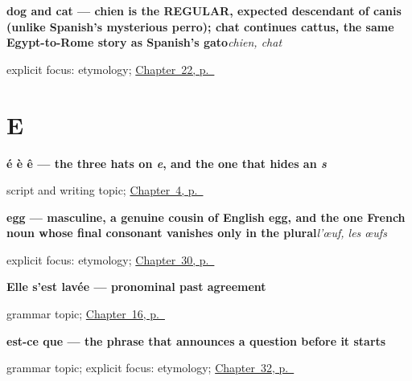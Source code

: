 \noindent\begin{minipage}[t]{\linewidth}
\raggedright
\textbf{dog and cat — chien is the REGULAR, expected descendant of canis (unlike Spanish's mysterious perro); chat continues cattus, the same Egypt-to-Rome story as Spanish's gato}\enspace\emph{chien, chat}\par
\footnotesize explicit focus: etymology; \hyperref[ch:fr-dog-and-cat]{Chapter~22, p.~\pageref*{ch:fr-dog-and-cat}}
\end{minipage}\par\smallskip

\section*{E}

\noindent\begin{minipage}[t]{\linewidth}
\raggedright
\textbf{é è ê — the three hats on \emph{e}, and the one that hides an \emph{s}}\par
\footnotesize script and writing topic; \hyperref[ch:farewells]{Chapter~4, p.~\pageref*{ch:farewells}}
\end{minipage}\par\smallskip

\noindent\begin{minipage}[t]{\linewidth}
\raggedright
\textbf{egg — masculine, a genuine cousin of English egg, and the one French noun whose final consonant vanishes only in the plural}\enspace\emph{l'œuf, les œufs}\par
\footnotesize explicit focus: etymology; \hyperref[ch:fr-cheese-butter-salt-egg]{Chapter~30, p.~\pageref*{ch:fr-cheese-butter-salt-egg}}
\end{minipage}\par\smallskip

\noindent\begin{minipage}[t]{\linewidth}
\raggedright
\textbf{Elle s’est lavée — pronominal past agreement}\par
\footnotesize grammar topic; \hyperref[ch:etre]{Chapter~16, p.~\pageref*{ch:etre}}
\end{minipage}\par\smallskip

\noindent\begin{minipage}[t]{\linewidth}
\raggedright
\textbf{est-ce que — the phrase that announces a question before it starts}\par
\footnotesize grammar topic; explicit focus: etymology; \hyperref[ch:fr-questions]{Chapter~32, p.~\pageref*{ch:fr-questions}}
\end{minipage}\par\smallskip

